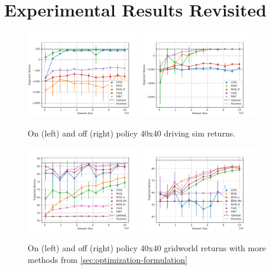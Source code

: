 \documentclass[10pt]{article}
\theoremstyle{plain}
\theoremstyle{remark}
\begin{document}
\section{Experimental Results Revisited}
\label{sec:experimental_results_revisited}
\begin{figure}
	\centering
	\includegraphics[width=0.45\textwidth]{../src/plots/returns/40x40_driving_on_policy_returns.pdf}
	\includegraphics[width=0.45\textwidth]{../src/plots/returns/40x40_driving_off_policy_returns.pdf}
	\caption{On (left) and off (right) policy 40x40 driving sim returns.}
	\label{fig:driving}
\end{figure}

\begin{figure}
	\centering
	\includegraphics[width=0.45\textwidth]{../src/plots/returns/40x40_gridworld_on_policy_all_returns.pdf}
	\includegraphics[width=0.45\textwidth]{../src/plots/returns/40x40_gridworld_off_policy_all_returns.pdf}
	\caption{On (left) and off (right) policy 40x40 gridworld returns with more methods from \cref{sec:optimization-formulation}}
	\label{fig:more_methods_gridworld}
\end{figure}
\end{document}
